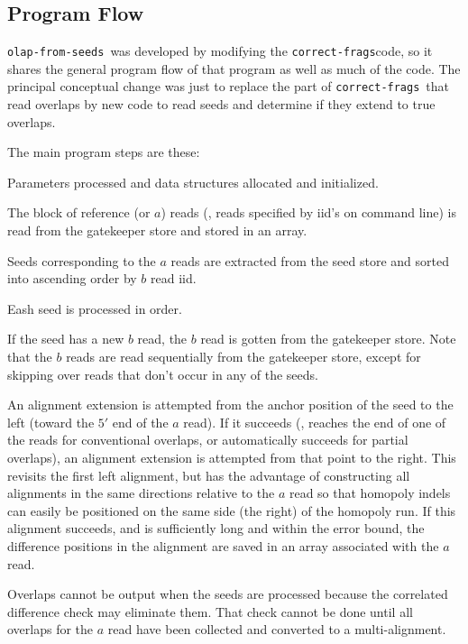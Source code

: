 \documentclass[letterpaper,11pt]{article}
\def\Pgm#1{\texttt{#1}}
\def\correctfrags{\Pgm{correct-frags}}
\def\ofs{\Pgm{olap-from-seeds}}
\newenvironment{technotes}{\bq\small\bf\bi\exdent{Technical Notes:}}{\ei\eq}
\def\btn{\begin{technotes}}
\begin{document}
\subsection{Program Flow}

\ofs\ was developed by modifying the
\correctfrags code, so it shares the general program flow of
that program as well as much of the code.  The principal conceptual
change was just to replace the part of \correctfrags\ that
read overlaps by new code to read seeds and determine if they
extend to true overlaps.

The main program steps are these:
\bn
\item
  Parameters processed and data structures allocated and initialized.
\item
  The block of reference (or $a$) reads (\ie, reads specified by iid's
  on command line) is read from the gatekeeper store and stored in an
  array.
\item
  Seeds corresponding to the $a$ reads are extracted from the
  seed store and sorted into ascending order by $b$ read iid.
\item
  Eash seed is processed in order.
  \bn
  \item
    If the seed has a new $b$ read, the $b$ read is gotten from the
    gatekeeper store.  Note that the $b$ reads are read sequentially
    from the gatekeeper store, except for skipping over reads that
    don't occur in any of the seeds.
  \item
    An alignment extension is attempted from the anchor position of the
    seed to the left (toward the $5'$ end of the $a$ read).  If it
    succeeds (\ie, reaches the end of one of the reads for conventional
    overlaps, or automatically succeeds for partial overlaps), an
    alignment extension is attempted from that point to the right.
    This revisits the first left alignment, but has the advantage of
    constructing all alignments in the same directions relative to the
    $a$ read so that homopoly indels can easily be positioned on the
    same side (the right) of the homopoly run.  If this alignment succeeds,
    and is sufficiently long and within the error bound, the difference
    positions in the alignment are saved in an array associated with the
    $a$ read.
  \en
  \btn
  \item
    Overlaps cannot be output when the seeds are processed because the
    correlated difference check may eliminate them.  That check cannot
    be done until all overlaps for the $a$ read have been collected
    and converted to a multi-alignment.
\end{document}
